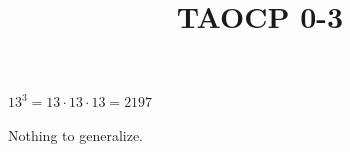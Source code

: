 \documentclass{article}
\title{TAOCP 0\mbox{-}3}
\begin{document}
\maketitle

\( 13^{3} = 13 \cdot 13 \cdot 13 = 2197 \)

Nothing to generalize.
\end{document}
